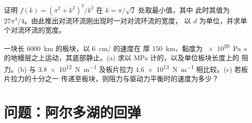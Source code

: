 \begin{exercise}[$\star\star\star$]\label{exo:b3:mantle-convection:11}
证明 $f(k) = (\pi^2 + k^2)^3/k^2$ 在 $k = \pi/\sqrt2$ 处取最小值，其中
此时其值为 $27\pi^4/4$。由此推出对流环流刚出现时一对对流环流的宽度，
以 $d$ 为单位，并求单个对流环流的宽度。
\end{exercise}

\begin{exercise}[$\star\star\star$]\label{exo:b3:mantle-convection:12}
一块长 \qty{6000}{km} 的板块，以 \qty{6}{cm/} 的速度在
厚 \qty{150}{km}、黏度为 \qty{e20}{Pa.s} 的地幔层之上运动，其底部静止。(a)
求以 \unit{MPa} 计的，以及单位板块长度上的
阻力。(b) 与 \qty{3.8e12}{N.m^{-1}} 及板片拉力
\qty{4.6e13}{N.m^{-1}} 相比较。(c) 若板片拉力的十分之一
传递至板块，则阻力与驱动力平衡时的速度为多少？
\end{exercise}

\section{问题：阿尔多湖的回弹}

